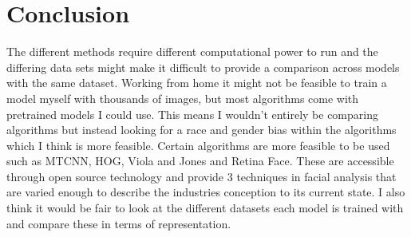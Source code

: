 \documentclass{article}
\begin{document}
\section{Conclusion}
The different methods require different computational power to run and the differing data
sets might make it difficult to provide a comparison across models with the same dataset.
Working from home it might not be feasible to train a model myself with thousands of images,
but most algorithms come with pretrained models I could use. This means I wouldn’t entirely
be comparing algorithms but instead looking for a race and gender bias within the algorithms
which I think is more feasible.
Certain algorithms are more feasible to be used such as MTCNN, HOG, Viola and Jones and
Retina Face. These are accessible through open source technology and provide 3 techniques
in facial analysis that are varied enough to describe the industries conception to its current
state. I also think it would be fair to look at the different datasets each model is trained with
and compare these in terms of representation. 
\newpage


\end{document}
